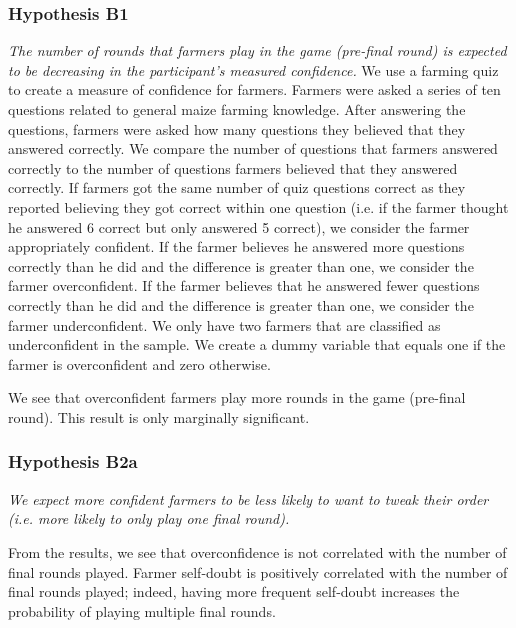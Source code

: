 \documentclass[12pt,letterpaper]{article}
\begin{document}


\begin{comment}



\end{comment}

\newpage
\subsubsection*{Hypothesis B1}
\textit{The number of rounds that farmers play in the game (pre-final round) is expected to be decreasing in the participant’s measured confidence.}
\noindent We use a farming quiz to create a measure of confidence for farmers. Farmers were asked a series of ten questions related to general maize farming knowledge. After answering the questions, farmers were asked how many questions they believed that they answered correctly. We compare the number of questions that farmers answered correctly to the number of questions farmers believed that they answered correctly. If farmers got the same number of quiz questions correct as they reported believing they got correct within one question (i.e. if the farmer thought he answered 6 correct but only answered 5 correct), we consider the farmer appropriately confident. If the farmer believes he answered more questions correctly than he did and the difference is greater than one, we consider the farmer overconfident. If the farmer believes that he answered fewer questions correctly than he did and the difference is greater than one, we consider the farmer underconfident. We only have two farmers that are classified as underconfident in the sample. We create a dummy variable that equals one if the farmer is overconfident and zero otherwise. 

We see that overconfident farmers play more rounds in the game (pre-final round). This result is only marginally significant. 


\newpage

\subsubsection*{Hypothesis B2a}
\textit{We expect more confident farmers to be less likely to want to tweak their order (i.e. more likely to only play one final round).}

\noindent From the results, we see that overconfidence is not correlated with the number of final rounds played. Farmer self-doubt is positively correlated with the number of final rounds played; indeed, having more frequent self-doubt increases the probability of playing multiple final rounds.


\newpage
\end{document}
